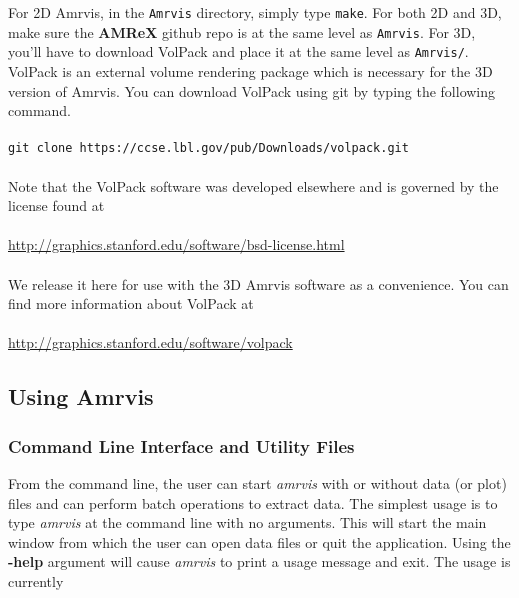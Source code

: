 \documentclass{article}
\begin{document}
For 2D Amrvis, in the {\tt Amrvis} directory, simply type {\tt make}.
For both 2D and 3D, make sure the {\bf AMReX} github repo is at the same level as {\tt Amrvis}.
For 3D, you'll have to download VolPack and place it at the same level as {\tt Amrvis/}.
VolPack is an external volume rendering package which is necessary for the 3D version of Amrvis.
You can download VolPack using git by typing the following command.\\ \\
{\tt git clone https://ccse.lbl.gov/pub/Downloads/volpack.git}\\ \\
Note that the VolPack software was developed elsewhere and is governed by the license found at\\ \\
\url{http://graphics.stanford.edu/software/bsd-license.html}\\ \\
We release it here for use with the 3D Amrvis software as a convenience. You can find more information about VolPack at \\ \\
\url{http://graphics.stanford.edu/software/volpack}
\subsection{Using Amrvis}

\subsubsection{Command Line Interface and Utility Files}

From the command line, the user can start {\em amrvis} with or without
data (or plot) files and can perform batch operations
to extract data.  The simplest usage is to type {\em amrvis} at the command
line with no arguments.  This will start the main window from which
the user can open data files or quit the application.  Using the {\bf -help}
argument will cause {\em amrvis} to print a usage message and exit.  The usage
is currently
\end{document}
